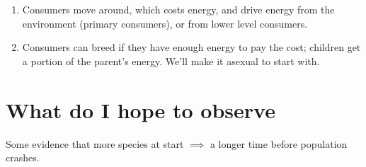 \documentclass[]{article}
\begin{document}
\begin{enumerate}
	\item Consumers move around, which costs energy, and drive energy from the environment (primary consumers), or from lower level consumers.
	\item Consumers can breed if they have enough energy to pay the cost; children get a portion of the parent's energy. We'll make it asexual to start with.
	
\end{enumerate}

\section{What do I hope to observe}

Some evidence that more species at start $\implies$ a longer time before population crashes.

\medskip



\end{document}
